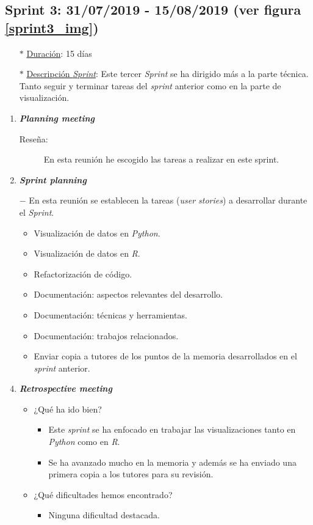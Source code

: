 \subsection{Sprint 3: 31/07/2019 - 15/08/2019 (ver figura \ref{sprint3_img})}\label{sprint3}
\begin{itemize}
	\item[$\ast$] \underline{Duración}:  15 días
	\item[$\ast$] \underline{Descripción \textit{Sprint}}: Este tercer \textit{Sprint} se ha dirigido más a la parte técnica. Tanto seguir y terminar tareas del \textit{sprint }anterior como en la parte de visualización.
\end{itemize}
\begin{enumerate}
	\item \textbf{\textit{Planning meeting}}
	\begin{description}
		\item[Reseña:] En esta reunión he escogido las tareas a realizar en este sprint.
	\end{description}
	\item \textbf{\textit{Sprint planning}}
		\item[$-$] En esta reunión se establecen la tareas (\textit{user stories}) a desarrollar durante el \textit{Sprint}. 
	\begin{itemize}
		\item Visualización de datos en \textit{Python}.
		\item Visualización de datos en \textit{R}.
		\item Refactorización de código.
		\item Documentación: aspectos relevantes del desarrollo.
		\item Documentación: técnicas y herramientas.
		\item Documentación: trabajos relacionados.
		\item Enviar copia a tutores de los puntos de la memoria desarrollados en el \textit{sprint} anterior.
	\end{itemize}
	\item \textbf{\textit{Retrospective meeting}}
	\begin{itemize}
		\item ¿Qué ha ido bien?
		\begin{itemize}
			\item Este \textit{sprint} se ha enfocado en trabajar las visualizaciones tanto en \textit{Python} como en \textit{R}. 
			\item Se ha avanzado mucho en la memoria y además se ha enviado una primera copia a los tutores para su revisión.
		\end{itemize}
		\item ¿Qué dificultades hemos encontrado?
		\begin{itemize}
			\item Ninguna dificultad destacada. 
		\end{itemize}
	\end{itemize}	
\end{enumerate}

